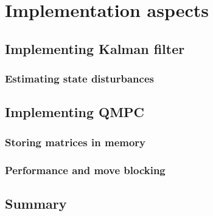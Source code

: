 \section{Implementation aspects}
\label{cap:Implementation}

\subsection{Implementing Kalman filter}

\subsubsection{Estimating state disturbances}

\subsection{Implementing QMPC}

\subsubsection{Storing matrices in memory}

\subsubsection{Performance and move blocking}
\label{cap:implementation_performance}

\subsection{Summary}